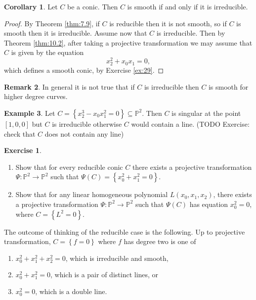 \documentclass{article}
\renewcommand{\P}{\mathbb{P}}
\newcommand{\rb}[1]{\left( #1 \right)}
\renewcommand{\sb}[1]{\left[ #1 \right]}
\newcommand{\cb}[1]{\left\{ #1 \right\}}
\theoremstyle{definition}\newtheorem{definition}{Definition}[section]
\theoremstyle{definition}\newtheorem{notation}[definition]{Notation}
\theoremstyle{definition}\newtheorem{remark}[definition]{Remark}
\theoremstyle{definition}\newtheorem{example}[definition]{Example}
\theoremstyle{definition}\newtheorem{fact}{Fact}
\theoremstyle{definition}\newtheorem{exercise}{Exercise}
\newtheorem{corollary}[definition]{Corollary}
\begin{document}
\begin{corollary}
Let $ C $ be a conic. Then $ C $ is smooth if and only if it is irreducible.
\end{corollary}

\begin{proof}
By Theorem \ref{thm:7.9}, if $ C $ is reducible then it is not smooth, so if $ C $ is smooth then it is irreducible. Assume now that $ C $ is irreducible. Then by Theorem \ref{thm:10.2}, after taking a projective transformation we may assume that $ C $ is given by the equation
$$ x_2^2 + x_0x_1 = 0, $$
which defines a smooth conic, by Exercise \ref{ex:29}.
\end{proof}

\begin{remark}
In general it is not true that if $ C $ is irreducible then $ C $ is smooth for higher degree curves.
\end{remark}

\begin{example}
Let $ C = \cb{x_2^3 - x_0x_1^2 = 0} \subseteq \P^2 $. Then $ C $ is singular at the point $ \sb{1, 0, 0} $ but $ C $ is irreducible otherwise $ C $ would contain a line. (TODO Exercise: check that $ C $ does not contain any line)
\end{example}

\begin{exercise}
\label{ex:30}
\hfill
\begin{enumerate}
\item Show that for every reducible conic $ C $ there exists a projective transformation $ \Psi : \P^2 \to \P^2 $ such that $ \Psi\rb{C} = \cb{x_0^2 + x_1^2 = 0} $.
\item Show that for any linear homogeneous polynomial $ L\rb{x_0, x_1, x_2} $, there exists a projective transformation $ \Psi : \P^2 \to \P^2 $ such that $ \Psi\rb{C} $ has equation $ x_0^2 = 0 $, where $ C = \cb{L^2 = 0} $.
\end{enumerate}
\end{exercise}

The outcome of thinking of the reducible case is the following. Up to projective transformation, $ C = \cb{f = 0} $ where $ f $ has degree two is one of
\begin{enumerate}
\item $ x_0^2 + x_1^2 + x_2^2 = 0 $, which is irreducible and smooth,
\item $ x_0^2 + x_1^2 = 0 $, which is a pair of distinct lines, or
\item $ x_0^2 = 0 $, which is a double line.
\end{enumerate}
\end{document}
